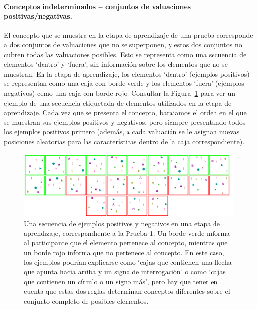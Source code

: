 \paragraph{Conceptos indeterminados -- conjuntos de valuaciones positivas/negativas.} \label{IncompleteConcepts} El concepto que se muestra en la etapa de aprendizaje de una prueba corresponde a dos conjuntos de valuaciones que no se superponen, y estos dos conjuntos no cubren todas las valuaciones posibles. Esto se representa como una secuencia de elementos `dentro' y `fuera', sin información sobre los elementos que no se muestran. En la etapa de aprendizaje, los elementos `dentro' (ejemplos positivos) se representan como una caja con borde verde y los elementos `fuera' (ejemplos negativos) como una caja con borde rojo. Consultar la Figura~\ref{Figure:training} para ver un ejemplo de una secuencia etiquetada de elementos utilizados en la etapa de aprendizaje. Cada vez que se presenta el concepto, barajamos el orden en el que se muestran sus ejemplos positivos y negativos, pero siempre presentando todos los ejemplos positivos primero (además, a cada valuación se le asignan nuevas posiciones aleatorias para las características dentro de la caja correspondiente).

\begin{figure}[h!] 
\begin{center}
    \includegraphics[scale=0.35]{../figuras/brm/Learning.PNG}
	\caption{
	Una secuencia de ejemplos positivos y negativos en una etapa de aprendizaje, correspondiente a la Prueba 1. Un borde verde informa al participante que el elemento pertenece al concepto, mientras que un borde rojo informa que no pertenece al concepto. En este caso, los ejemplos podrían explicarse como `cajas que contienen una flecha que apunta hacia arriba y un signo de interrogación' o como `cajas que contienen un círculo o un signo más', pero hay que tener en cuenta que estas dos reglas determinan conceptos diferentes sobre el conjunto completo de posibles elementos.}
	\label{Figure:training}
\end{center}
\end{figure}


